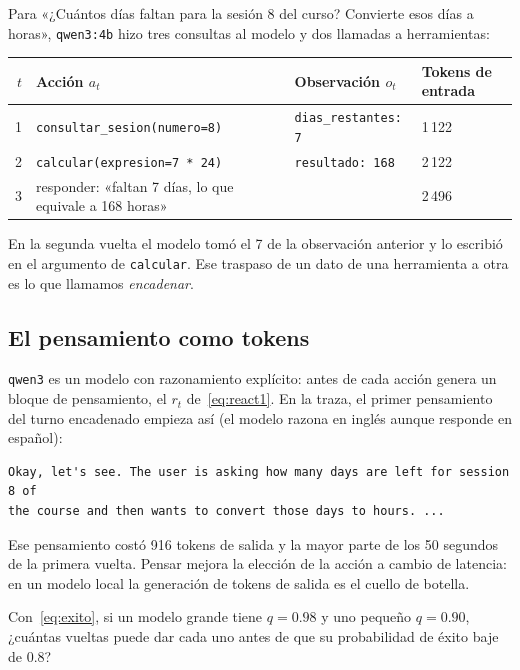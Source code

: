 \documentclass[11pt,letterpaper,oneside]{report}
\begin{document}
\begin{ejemplo}
Para «¿Cuántos días faltan para la sesión 8 del curso? Convierte esos días a horas», \texttt{qwen3:4b} hizo tres consultas al modelo y dos llamadas a herramientas:
\begin{center}\small
\begin{tabular}{@{}rlll@{}}
\toprule
$t$ & Acción $a_t$ & Observación $o_t$ & Tokens de entrada \\
\midrule
1 & \texttt{consultar\_sesion(numero=8)} & \texttt{dias\_restantes: 7} & 1\,122 \\
2 & \texttt{calcular(expresion=\textquotedbl{}7 * 24\textquotedbl{})} & \texttt{resultado: 168} & 2\,122 \\
3 & \textsf{responder}: «faltan 7 días, lo que equivale a 168 horas» & & 2\,496 \\
\bottomrule
\end{tabular}
\end{center}
En la segunda vuelta el modelo tomó el 7 de la observación anterior y lo escribió en el argumento de \texttt{calcular}. Ese traspaso de un dato de una herramienta a otra es lo que llamamos \emph{encadenar}.
\end{ejemplo}

\subsection{El pensamiento como tokens}

\texttt{qwen3} es un modelo con razonamiento explícito: antes de cada acción genera un bloque de pensamiento, el $r_t$ de~\eqref{eq:react1}. En la traza, el primer pensamiento del turno encadenado empieza así (el modelo razona en inglés aunque responde en español):

\begin{lstlisting}[language={}, caption={Inicio del pensamiento $r_1$ del turno encadenado.}]
Okay, let's see. The user is asking how many days are left for session 8 of
the course and then wants to convert those days to hours. ...
\end{lstlisting}

Ese pensamiento costó 916 tokens de salida y la mayor parte de los 50 segundos de la primera vuelta. Pensar mejora la elección de la acción a cambio de latencia: en un modelo local la generación de tokens de salida es el cuello de botella.

\begin{ejercicio}
Con~\eqref{eq:exito}, si un modelo grande tiene $q=0.98$ y uno pequeño $q=0.90$, ¿cuántas vueltas puede dar cada uno antes de que su probabilidad de éxito baje de $0.8$?
\end{ejercicio}
\end{document}
